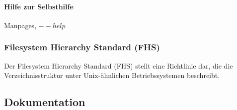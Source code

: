 \paragraph{Hilfe zur Selbsthilfe}

Manpages, $--help$

\subsubsection{Filesystem Hierarchy Standard (FHS)}

Der Filesystem Hierarchy Standard (FHS) stellt eine Richtlinie dar, die die Verzeichnisstruktur unter Unix-ähnlichen Betriebssystemen beschreibt.




\subsection{Dokumentation}

